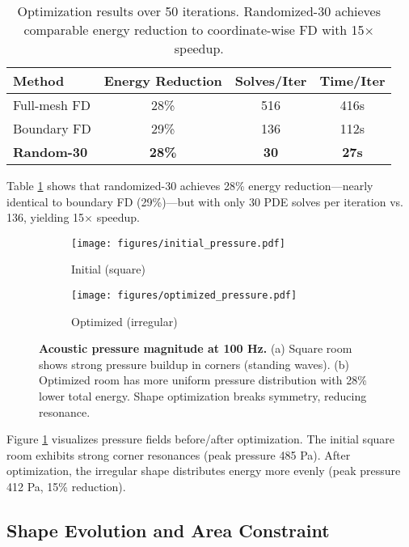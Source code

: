 \documentclass{article}
\begin{document}
\begin{table}[t]
\centering
\caption{Optimization results over 50 iterations. Randomized-30 achieves comparable energy reduction to coordinate-wise FD with 15$\times$ speedup.}
\label{tab:results}
\small
\begin{tabular}{lccc}
\toprule
\textbf{Method} & \textbf{Energy Reduction} & \textbf{Solves/Iter} & \textbf{Time/Iter} \\
\midrule
Full-mesh FD & 28\% & 516 & 416s \\
Boundary FD  & 29\% & 136 & 112s \\
\textbf{Random-30} & \textbf{28\%} & \textbf{30} & \textbf{27s} \\
\bottomrule
\end{tabular}
\end{table}

Table \ref{tab:results} shows that randomized-30 achieves 28\% energy reduction—nearly identical to boundary FD (29\%)—but with only 30 PDE solves per iteration vs. 136, yielding 15$\times$ speedup.

\begin{figure}[t]
\centering
\begin{subfigure}{0.48\columnwidth}
    \texttt{[image: figures/initial\_pressure.pdf]}
    \caption{Initial (square)}
\end{subfigure}
\hfill
\begin{subfigure}{0.48\columnwidth}
    \texttt{[image: figures/optimized\_pressure.pdf]}
    \caption{Optimized (irregular)}
\end{subfigure}
\caption{\textbf{Acoustic pressure magnitude at 100 Hz.} (a) Square room shows strong pressure buildup in corners (standing waves). (b) Optimized room has more uniform pressure distribution with 28\% lower total energy. Shape optimization breaks symmetry, reducing resonance.}
\label{fig:pressure}
\end{figure}

Figure \ref{fig:pressure} visualizes pressure fields before/after optimization. The initial square room exhibits strong corner resonances (peak pressure 485 Pa). After optimization, the irregular shape distributes energy more evenly (peak pressure 412 Pa, 15\% reduction).

\subsection{Shape Evolution and Area Constraint}
\end{document}
